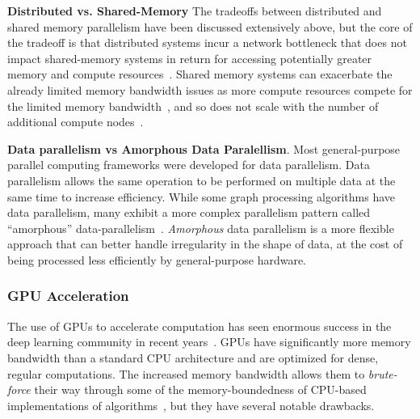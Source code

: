 \textbf{Distributed vs. Shared-Memory}
The tradeoffs between distributed and shared memory parallelism have been discussed extensively above, but the core of the tradeoff is that distributed systems incur a network bottleneck that does not impact shared-memory systems in return for accessing potentially greater memory and compute resources~\cite{Shun2013, Beamer2015}.
Shared memory systems can exacerbate the already limited memory bandwidth issues as more compute resources compete for the limited memory bandwidth~\cite{Shun2015}, and so does not scale with the number of additional compute nodes~\cite{Ahn2015,Kepner2016}.

\textbf{Data parallelism vs Amorphous Data Paralellism}.
Most general-purpose parallel computing frameworks were developed for data parallelism. 
Data parallelism allows the same operation to be performed on multiple data at the same time to increase efficiency. 
While some graph processing algorithms have data parallelism, many exhibit a more complex parallelism pattern called “amorphous” data-parallelism~\cite{Lenharth2016}.
\textit{Amorphous} data parallelism is a more flexible approach that can better handle irregularity in the shape of data, at the cost of being processed less efficiently by general-purpose hardware. 

\subsubsection{GPU Acceleration}
The use of GPUs to accelerate computation has seen enormous success in the deep learning community in recent years~\cite{Dally2021}.
GPUs have significantly more memory bandwidth than a standard CPU architecture and are optimized for dense, regular computations. 
The increased memory bandwidth allows them to \textit{brute-force} their way through some of the memory-boundedness of CPU-based implementations of algorithms~\cite{Aananthakrishnan2020}, but they have several notable drawbacks. 

